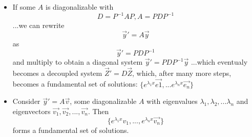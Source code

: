 \documentclass[10pt,letterpaper]{article}
\begin{document}
\begin{itemize}
\item If some $A$ is diagonalizable with 
$$D = P^{-1}AP, A=PDP^{-1}$$ 
...we can rewrite $$\vec{y}'=A\vec{y}$$ as 
$$\vec{y}'=PDP^{-1}$$
and multiply to obtain a diagonal system $\vec{y}' = PDP^{-1}\vec{y}$
...which eventualy becomes a decoupled system $\vec{Z}'=D\vec{Z}$, which,
after many more steps, becomes a fundamental set of solutions: 
$\{ e^{\lambda_1x}\vec{e1},...e^{\lambda _nx}\vec{e_n}\}$

\item Consider $\vec{y}'=A\vec{v}$, some diagonalizable $A$ with eigenvalues $\lambda_1,\lambda_2,...\lambda_n$ and eigenvectors $\vec{v_1},\vec{v_2},...,\vec{v_n}$. Then 
$$\{e^{\lambda_1x}v_1,...,e^{\lambda_nx}\vec{v_n}\}$$
forms a fundamental set of solutions. 

\end{itemize}
\end{document}
